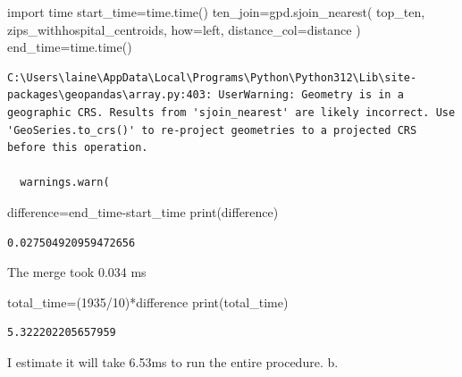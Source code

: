 \documentclass[
  letterpaper,
  DIV=11,
  numbers=noendperiod]{scrartcl}
\newenvironment{Shaded}{\begin{snugshade}}{\end{snugshade}}
\newcommand{\BuiltInTok}[1]{\textcolor[rgb]{0.00,0.23,0.31}{#1}}
\newcommand{\DecValTok}[1]{\textcolor[rgb]{0.68,0.00,0.00}{#1}}
\newcommand{\ImportTok}[1]{\textcolor[rgb]{0.00,0.46,0.62}{#1}}
\newcommand{\NormalTok}[1]{\textcolor[rgb]{0.00,0.23,0.31}{#1}}
\newcommand{\OperatorTok}[1]{\textcolor[rgb]{0.37,0.37,0.37}{#1}}
\newcommand{\StringTok}[1]{\textcolor[rgb]{0.13,0.47,0.30}{#1}}
\begin{document}
\begin{Shaded}
\begin{Highlighting}[]
\ImportTok{import}\NormalTok{ time}
\NormalTok{start\_time}\OperatorTok{=}\NormalTok{time.time()}
\NormalTok{ten\_join}\OperatorTok{=}\NormalTok{gpd.sjoin\_nearest(}
\NormalTok{    top\_ten,}
\NormalTok{    zips\_withhospital\_centroids,}
\NormalTok{    how}\OperatorTok{=}\StringTok{\textquotesingle{}left\textquotesingle{}}\NormalTok{,}
\NormalTok{    distance\_col}\OperatorTok{=}\StringTok{\textquotesingle{}distance\textquotesingle{}}
\NormalTok{)}
\NormalTok{end\_time}\OperatorTok{=}\NormalTok{time.time()}
\end{Highlighting}
\end{Shaded}

\begin{verbatim}
C:\Users\laine\AppData\Local\Programs\Python\Python312\Lib\site-packages\geopandas\array.py:403: UserWarning: Geometry is in a geographic CRS. Results from 'sjoin_nearest' are likely incorrect. Use 'GeoSeries.to_crs()' to re-project geometries to a projected CRS before this operation.

  warnings.warn(
\end{verbatim}

\begin{Shaded}
\begin{Highlighting}[]
\NormalTok{difference}\OperatorTok{=}\NormalTok{end\_time}\OperatorTok{{-}}\NormalTok{start\_time}
\BuiltInTok{print}\NormalTok{(difference)}
\end{Highlighting}
\end{Shaded}

\begin{verbatim}
0.027504920959472656
\end{verbatim}

The merge took 0.034 ms

\begin{Shaded}
\begin{Highlighting}[]
\NormalTok{total\_time}\OperatorTok{=}\NormalTok{(}\DecValTok{1935}\OperatorTok{/}\DecValTok{10}\NormalTok{)}\OperatorTok{*}\NormalTok{difference}
\BuiltInTok{print}\NormalTok{(total\_time)}
\end{Highlighting}
\end{Shaded}

\begin{verbatim}
5.322202205657959
\end{verbatim}

I estimate it will take 6.53ms to run the entire procedure. b.
\end{document}
